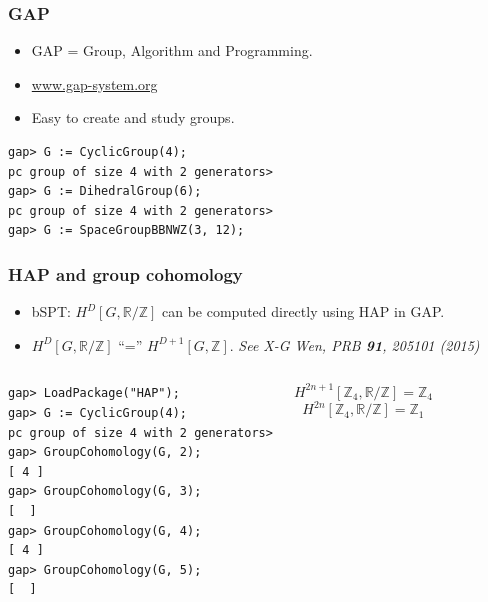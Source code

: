 \documentclass[xcolor=table, aspectratio=169]{beamer}
\newcommand{\uone}{\mathbb R/\mathbb Z}
\begin{document}
\begin{frame}[fragile]
\frametitle{GAP}
\begin{itemize}
\item GAP = Group, Algorithm and Programming.
\item \url{www.gap-system.org}
\item Easy to create and study groups.
\end{itemize}

\begin{lstlisting}[basicstyle=\footnotesize]
gap> G := CyclicGroup(4);
pc group of size 4 with 2 generators>
gap> G := DihedralGroup(6);
pc group of size 4 with 2 generators>
gap> G := SpaceGroupBBNWZ(3, 12);
\end{lstlisting}

\end{frame}

\begin{frame}[fragile]
	\frametitle{HAP and group cohomology}
	\begin{itemize}
		\item bSPT: $H^D[G,\uone]$ can be computed directly using HAP in GAP.
		\item $H^D[G,\uone]$ ``='' $H^{D+1}[G,\mathbb Z]$. \emph{See X-G Wen, PRB \textbf{91}, 205101 (2015)}
	\end{itemize}
	\begin{columns}
	\begin{lstlisting}[basicstyle=\footnotesize]
gap> LoadPackage("HAP");
gap> G := CyclicGroup(4);
pc group of size 4 with 2 generators>
gap> GroupCohomology(G, 2);
[ 4 ]
gap> GroupCohomology(G, 3);
[  ]
gap> GroupCohomology(G, 4);
[ 4 ]
gap> GroupCohomology(G, 5);
[  ]
\end{lstlisting}
	\[H^{2n+1}[\mathbb Z_4,\uone] = \mathbb Z_4\]
	\[H^{2n}[\mathbb Z_4,\uone] = \mathbb Z_1\]
	\end{columns}
\end{frame}
\end{document}
